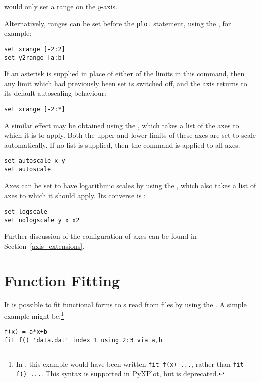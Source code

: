 \noindent would only set a range on the $y$-axis.

Alternatively, ranges can be set before the {\tt plot} statement, using the
, for example:

\begin{verbatim}
set xrange [-2:2]
set y2range [a:b]
\end{verbatim}

If an asterisk is supplied in place of either of the limits in this command, then
any limit which had previously been set is switched off, and the axis returns to
its default autoscaling behaviour:

\begin{verbatim}
set xrange [-2:*]
\end{verbatim}

\noindent A similar effect may be obtained using the ,
which takes a list of the axes to which it is to apply. Both the upper and
lower limits of these axes are set to scale automatically. If no list is
supplied, then the command is applied to all axes.

\begin{verbatim}
set autoscale x y
set autoscale
\end{verbatim}

Axes can be set to have logarithmic scales by using the ,
which also takes a list of axes to which it should apply. Its converse is
:

\begin{verbatim}
set logscale
set nologscale y x x2
\end{verbatim}

Further discussion of the configuration of axes can be found in
Section~\ref{axis_extensions}.

\section{Function Fitting}
\label{fit_command}

It is possible to fit functional forms to \datapoint s read from files by using
the . A simple example might be:\footnote{In \gnuplot, this
example would have been written {\tt fit f(x) ...}, rather than {\tt fit f()
...}. This syntax is supported in PyXPlot, but is deprecated.}

\begin{verbatim}
f(x) = a*x+b
fit f() 'data.dat' index 1 using 2:3 via a,b
\end{verbatim}

